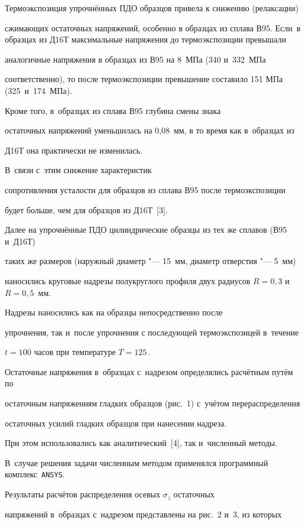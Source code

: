 Термоэкспозиция упрочнённых ПДО образцов привела к снижению (релаксации)

сжимающих ос\-таточных напряжений, особенно в образцах из сплава В95. Если~в образцах из Д16Т максимальные напряжения до термоэкспозиции превышали

аналогичные напряжения в образцах из В95 на 8~МПа (340 и~332~МПа

соответственно), то после термоэкспозиции превышение составило 151 МПа (325~и~174~МПа).

Кроме того, в~образцах из сплава В95 глубина смены знака

остаточных напряжений уменьшилась на 0,08~мм, в то время как в~образцах из

Д16Т она практически не изменилась.

В~связи с~этим снижение характеристик

сопротивления усталости для образцов из сплава В95 после термоэкспозиции

будет больше, чем для образцов из Д16Т~[3].



Далее на упрочнённые ПДО цилиндрические образцы из тех же сплавов (В95 и~Д16Т)

таких же размеров (наружный диаметр "--- 15~мм, диаметр отверстия "--- 5~мм)

наносились круговые надрезы полукруглого профиля двух радиусов $R=0,3$ и~$R=0,5$~мм.

Надрезы наносились как на образцы непосредственно после

упрочнения, так и~после упрочнения с последующей термоэкспозицей в~течение

$t=100$ часов при температуре $T=125$\,\textcelsius.



Остаточные напряжения в~образцах с~надрезом определялись расчётным путём по

остаточным напряжениям гладких образцов (рис.~1) с~учётом перераспределения

остаточных усилий гладких образцов при нанесении надреза.

При этом использовались как аналитический~[4], так и~численный методы.

В~случае решения задачи численным методом применялся программный комплекс~{\tt ANSYS}.

Результаты расчётов распределения осевых $\sigma _{z}$ остаточных

напряжений в~образцах с~надрезом представлены на рис.~2 и~3, из которых

